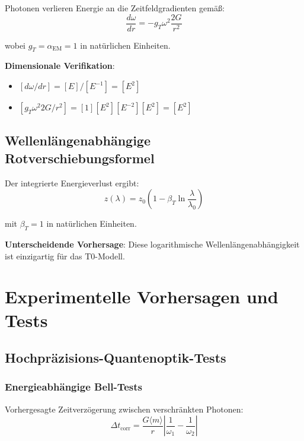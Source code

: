\documentclass[12pt,a4paper]{article}
\begin{document}
	Photonen verlieren Energie an die Zeitfeldgradienten gemäß:
	\begin{equation}
		\frac{d\omega}{dr} = -g_T \omega^2 \frac{2G}{r^2}
		\label{eq:photon_energy_loss}
	\end{equation}
	
	wobei $g_T = \alpha_{\text{EM}} = 1$ in natürlichen Einheiten.
	
	\textbf{Dimensionale Verifikation}:
	\begin{itemize}
		\item $[d\omega/dr] = [E]/[E^{-1}] = [E^2]$
		\item $[g_T \omega^2 2G/r^2] = [1][E^2][E^{-2}][E^2] = [E^2]$ \checkmark
	\end{itemize}
	
	\subsection{Wellenlängenabhängige Rotverschiebungsformel}
	
	Der integrierte Energieverlust ergibt:
	\begin{equation}
		z(\lambda) = z_0\left(1 - \beta_T \ln\frac{\lambda}{\lambda_0}\right)
		\label{eq:wavelength_dependent_redshift}
	\end{equation}
	
	mit $\beta_T = 1$ in natürlichen Einheiten.
	
	\textbf{Unterscheidende Vorhersage}: Diese logarithmische Wellenlängenabhängigkeit ist einzigartig für das T0-Modell.
	
	\section{Experimentelle Vorhersagen und Tests}
	
	\subsection{Hochpräzisions-Quantenoptik-Tests}
	
	\subsubsection{Energieabhängige Bell-Tests}
	
	Vorhergesagte Zeitverzögerung zwischen verschränkten Photonen:
	\begin{equation}
		\Delta t_{\text{corr}} = \frac{G\langle m \rangle}{r} \left|\frac{1}{\omega_1} - \frac{1}{\omega_2}\right|
		\label{eq:correlation_time_delay}
	\end{equation}
	
\end{document}
